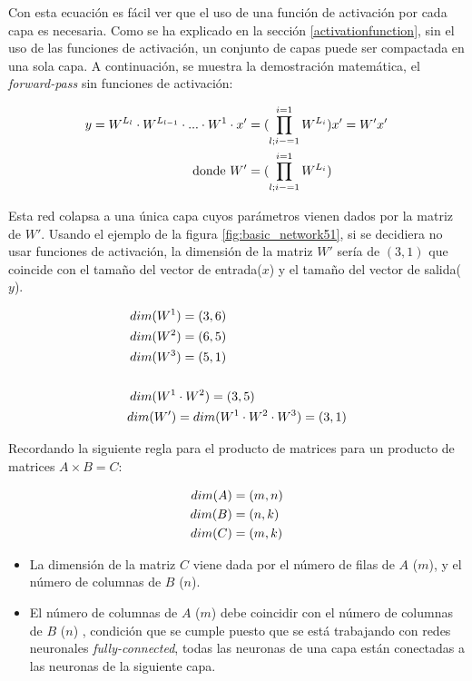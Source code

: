Con esta ecuación es fácil ver que el uso de una función de activación por cada capa es necesaria. Como se ha explicado en la sección \ref{activationfunction}, sin el uso de las funciones de activación, un conjunto de capas puede ser compactada en una sola capa. A continuación, se muestra la demostración matemática, el \textit{forward-pass} sin funciones de activación:


\begin{equation}
\centering
    \begin{split}
    y = W^{L_l} \cdot W^{L_{l-1}} \cdot ... \cdot W^{1} \cdot x' &= (\prod_{l;i-=1}^{i=1} W^{L_i})x' = W'x'\\
    \text{donde}~W' &= (\prod_{l;i-=1}^{i=1} W^{L_i})
  \end{split}
    \label{eqn:feedforwardnoactivation}
\end{equation}

Esta red colapsa a una única capa cuyos parámetros vienen dados por la matriz de $W'$. Usando el ejemplo de la figura \ref{fig:basic_network51}, si se decidiera no usar funciones de activación, la dimensión de la matriz $W'$ sería de $(3,1)$ que coincide con el tamaño del vector de entrada($x$) y el tamaño del vector de salida($y$).

\begin{equation}
\centering
    \begin{split}
    dim(W^1&) = (3,6) \\
    dim(W^2&) = (6,5) \\
    dim(W^3&) = (5,1) \\ \\
    dim(W^1 &\cdot W^2) = (3,5)\\
    dim(W') &= dim(W^1 \cdot W^2 \cdot W^3) = (3,1)
    \end{split}
\end{equation}

Recordando la siguiente regla para el producto de matrices para un producto de matrices $A \times B = C$:

\begin{equation}
\centering
    \begin{split}
    dim(A) &= (m, n) \\
    dim(B) &= (n, k) \\
    dim(C) &= (m, k)
    \end{split}
    \label{eqn:dimensions}
\end{equation}

\begin{itemize}
    \item La dimensión de la matriz $C$ viene dada por el número de filas de $A$ ($m$), y el número de columnas de $B$ ($n$).
    \item El número de columnas de $A$ ($m$) debe coincidir con el número de columnas de $B$ ($n$)
    , condición que se cumple puesto que se está trabajando con redes neuronales \textit{fully-connected}, todas las neuronas de una capa están conectadas a las neuronas de la siguiente capa.
\end{itemize}

